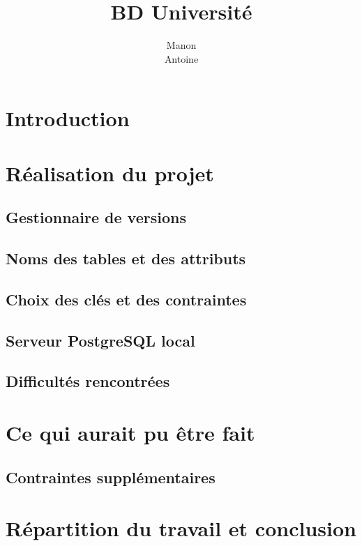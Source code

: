\documentclass[12pt,titlepage,a4paper]{report}
\title{BD Université}
\author{Manon \bsc{Ansart}\\ Antoine \bsc{Augusti}}
\begin{document}

	\dominitoc
	\tableofcontents

	\chapter{Introduction}
		

	\chapter{Réalisation du projet}
		\section{Gestionnaire de versions}
		

		\section{Noms des tables et des attributs}
		

		\section{Choix des clés et des contraintes}
		

		\section{Serveur PostgreSQL local}
		
		
		\section{Difficultés rencontrées}
		

	\chapter{Ce qui aurait pu être fait}
		\section{Contraintes supplémentaires}
		

	\chapter{Répartition du travail et conclusion}
		
\end{document}
